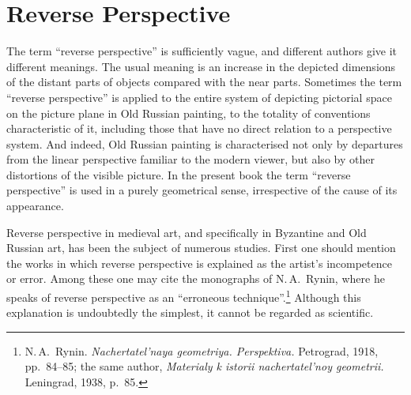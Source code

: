 
\chapter{Reverse Perspective}


The term ``reverse perspective'' is sufficiently vague, and different authors give it
different meanings.  The usual meaning is an increase in the depicted dimensions of
the distant parts of objects compared with the near parts.  Sometimes the term
``reverse perspective'' is applied to the entire system of depicting pictorial space
on the picture plane in Old Russian painting, to the totality of conventions
characteristic of it, including those that have no direct relation to a perspective
system.  And indeed, Old Russian painting is characterised not only by departures
from the linear perspective familiar to the modern viewer, but also by other
distortions of the visible picture.  In the present book the term ``reverse
perspective'' is used in a purely geometrical sense, irrespective of the cause of
its appearance.

Reverse perspective in medieval art, and specifically in Byzantine and Old Russian
art, has been the subject of numerous studies.  First one should mention the works in
which reverse perspective is explained as the artist's incompetence or error.  Among
these one may cite the monographs of N.\,A.~Rynin, where he speaks of reverse
perspective as an ``erroneous technique''.\footnote{N.\,A.~Rynin.
  \emph{Nachertatel'naya geometriya.  Perspektiva.}  Petrograd, 1918, pp.~84--85;
  the same author, \emph{Materialy k istorii nachertatel'noy geometrii.}  Leningrad,
  1938, p.~85.}
Although this explanation is undoubtedly the simplest, it cannot be regarded as
scientific.


